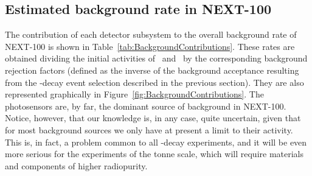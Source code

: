 \subsection{Estimated background rate in NEXT-100} \label{sec:BkgRate}
The contribution of each detector subsystem to the overall background rate of NEXT-100 is shown in Table~\ref{tab:BackgroundContributions}. These rates are obtained dividing the initial activities of \Tl\ and \Bi\ by the corresponding background rejection factors (defined as the inverse of the background acceptance resulting from the \bbonu-decay event selection described in the previous section). They are also represented graphically in Figure~\ref{fig:BackgroundContributions}. The photosensors are, by far, the dominant source of background in NEXT-100. Notice, however, that our knowledge is, in any case, quite uncertain, given that for most background sources we only have at present a limit to their activity. This is, in fact, a problem common to all \bbonu-decay experiments, and it will be even more serious for the experiments of the tonne scale, which will require materials and components of higher radiopurity.


